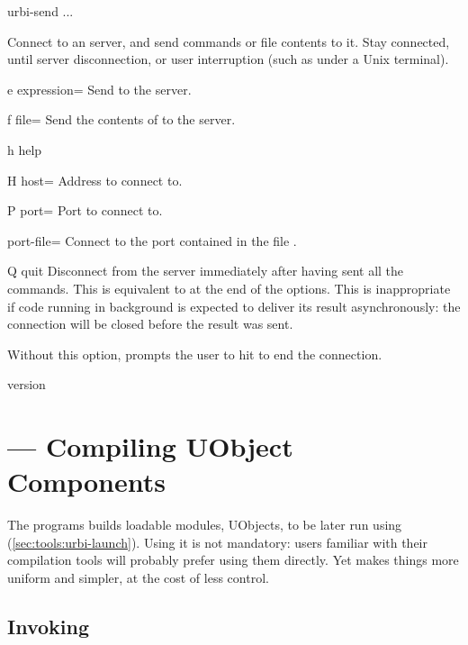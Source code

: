 \begin{shell}
urbi-send ...
\end{shell}

Connect to an \urbi server, and send commands or file contents to it.
Stay connected, until server disconnection, or user interruption (such
as  under a Unix terminal).

\begin{options}
\item[e]{expression=} Send  to the server.
\item[f]{file=} Send the contents of  to the
  server.
\item[h]{help} \optionHelp
\item[H]{host=} Address to connect to.
\item[P]{port=} Port to connect to.
\item{port-file=} Connect to the port contained in the file
  .
\item[Q]{quit} Disconnect from the server immediately after having sent all
  the commands.  This is equivalent to  at the end of the
  options.  This is inappropriate if code running in background is expected
  to deliver its result asynchronously: the connection will be closed before
  the result was sent.

  Without this option,  prompts the user to hit
   to end the connection.
\item{version} \optionVersion
\end{options}


\section{ --- Compiling UObject Components}
\label{sec:tools:umake}

The  programs builds loadable modules, UObjects, to be
later run using 
(\autoref{sec:tools:urbi-launch}).  Using it is not mandatory: users
familiar with their compilation tools will probably prefer using them
directly.  Yet  makes things more uniform and simpler,
at the cost of less control.

\subsection{Invoking }
\label{sec:tools:umake:invoke}

